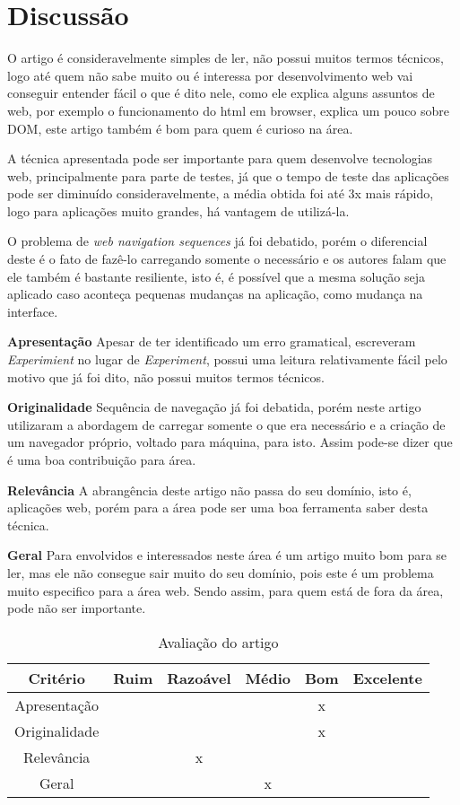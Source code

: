 \documentclass[conference]{IEEEtran}
\begin{document}
\section{Discussão}
\label{sec:discussao}
O artigo\cite{art:main} é consideravelmente simples de ler, não possui muitos
termos técnicos, logo até quem não sabe muito ou é interessa por desenvolvimento
web vai conseguir entender fácil o que é dito nele, como ele explica alguns
assuntos de web, por exemplo o funcionamento do html em browser, explica um
pouco sobre DOM, este artigo também é bom para quem é curioso na área.

A técnica apresentada pode ser importante para quem desenvolve tecnologias web,
principalmente para parte de testes, já que o tempo de teste das aplicações pode
ser diminuído consideravelmente, a média obtida foi até 3x mais rápido, logo
para aplicações muito grandes, há vantagem de utilizá-la.

O problema de \emph{web navigation sequences} já foi debatido, porém o
diferencial deste é o fato de fazê-lo carregando somente o necessário e os
autores falam que ele também é bastante resiliente, isto é, é possível que a
mesma solução seja aplicado caso aconteça pequenas mudanças na aplicação, como
mudança na interface.

\textbf{Apresentação} Apesar de ter identificado um erro gramatical, escreveram
\emph{Experimient} no lugar de \emph{Experiment}, possui uma leitura
relativamente fácil pelo motivo que já foi dito, não possui muitos termos
técnicos.

\textbf{Originalidade} Sequência de navegação já foi debatida, porém neste
artigo\cite{art:main} utilizaram a abordagem de carregar somente o que era
necessário e a criação de um navegador próprio, voltado para máquina, para isto.
Assim pode-se dizer que é uma boa contribuição para área.

\textbf{Relevância} A abrangência deste artigo não passa do seu domínio, isto é,
aplicações web, porém para a área pode ser uma boa ferramenta saber desta
técnica.

\textbf{Geral} Para envolvidos e interessados neste área é um artigo muito bom
para se ler, mas ele não consegue sair muito do seu domínio, pois este é um
problema muito especifico para a área web. Sendo assim, para quem está de fora
da área, pode não ser importante.

\begin{table}[h]
  \centering
  \begin{tabular}{|c|c|c|c|c|c|}
    \hline
    \textbf{Critério} & \textbf{Ruim} & \textbf{Razoável} & \textbf{Médio}
    & \textbf{Bom} & \textbf{Excelente} \\
    \hline
    Apresentação & & & & x & \\
    \hline
    Originalidade & & & & x & \\
    \hline
    Relevância & & x & & & \\
    \hline
    Geral & & & x & & \\
    \hline
  \end{tabular}
  \caption{Avaliação do artigo\cite{art:main}}
  \label{tab:avaliacao}
\end{table}


\end{document}

